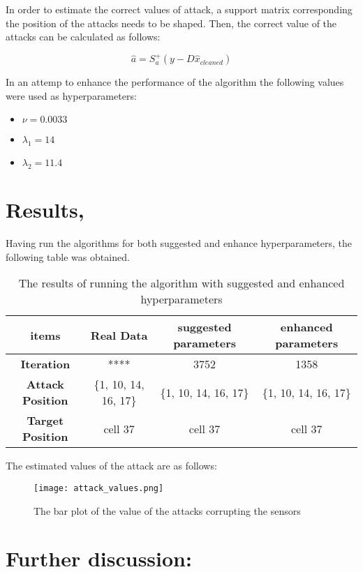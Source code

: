 In order to estimate the correct values of attack, a support matrix corresponding the position of the attacks needs to be shaped. Then, the correct value of the attacks can be calculated as follows:

\begin{equation}
	\hat{a} = S_a^{+} \left( y - D \hat{x}_{cleaned}\right)
\end{equation}

In an attemp to enhance the performance of the algorithm the following values were used as hyperparameters:
\begin{itemize}
	\item $\nu = 0.0033$
	\item $\lambda_1 = 14$
	\item $\lambda_2 = 11.4$
\end{itemize}


\section{Results,}
Having run the algorithms for both suggested and enhance hyperparameters, the following table was obtained.

\begin{table}[ht]
\centering
\begin{tabular}{|c|c|c|c|}
\hline
\textbf{items} & \textbf{Real Data} & \textbf{suggested parameters} & \textbf{enhanced parameters} \\ \hline
\textbf{Iteration} & **** & 3752 & 1358 \\ \hline
\textbf{Attack Position} & \{1, 10, 14, 16, 17\} & \{1, 10, 14, 16, 17\} & \{1, 10, 14, 16, 17\} \\ \hline
\textbf{Target Position} & cell 37 & cell 37 & cell 37 \\ \hline
\end{tabular}
\caption{The results of running the algorithm with suggested and enhanced hyperparameters}
\end{table}

The estimated values of the attack are as follows:

\begin{figure}[H] %
    \centering
    \texttt{[image: attack\_values.png]} %
    \caption{The bar plot of the value of the attacks corrupting the sensors}
\end{figure}

\section{Further discussion: }
